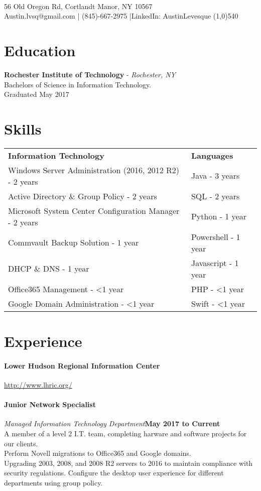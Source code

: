 \documentclass[10pt]{article}
\begin{document}
\begin{center}
\\
56 Old Oregon Rd, Cortlandt Manor, NY 10567\\
Austin.lvsq@gmail.com | (845)-667-2975 |LinkedIn: AustinLevesque
\line(1,0){540}
\end{center}
\section*{\large Education}
{\bf Rochester Institute of Technology} - {\it Rochester, NY}\\
Bachelors of Science in Information Technology.\\
Graduated May 2017
\section*{\large Skills}
\begin{tabu}{@{}X[4] @{}X[1]}%
\bf Information Technology & \bf Languages \\
Windows Server Administration (2016, 2012 R2) - 2 years & Java - 3 years\\
Active Directory \& Group Policy - 2 years & SQL - 2 years\\
Microsoft System Center Configuration Manager - 2 years & Python - 1 year\\
Commvault Backup Solution - 1 year & Powershell - 1 year\\
DHCP \& DNS - 1 year & Javascript - 1 year\\
Office365 Management - \textless 1 year & PHP - \textless 1 year \\
Google Domain Administration - \textless 1 year & Swift - \textless 1 year
\end{tabu}
\section*{\large Experience}
\paragraph{{\bf Lower Hudson Regional Information Center}}\hfill{\underline {http://www.lhric.org/}~~~}
\paragraph{\bf Junior Network Specialist} {\it Managed Information Technology Department}\hfill {\bf May 2017 to Current}\\
A member of a level 2 I.T. team, completing harware and software projects for our clients.\\
Perform Novell migrations to Office365 and Google domains.\\
Upgrading 2003, 2008, and 2008 R2 servers to 2016 to maintain compliance with security regulations.
Configure the desktop user experience for different departments using group policy.
\end{document}
